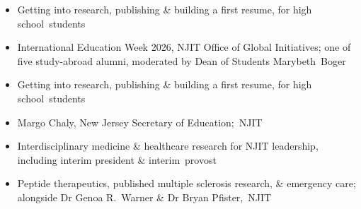 \begin{itemize}
  \item Getting into research, publishing \& building a first resume, for high \cvkeep{}school~\cvlast{}students\cvkeepend{}
\end{itemize}
\begin{itemize}
  \item International Education Week 2026, NJIT Office of Global Initiatives; one of five study-abroad alumni, moderated by Dean of Students \cvkeep{}Marybeth~\cvlast{}Boger\cvkeepend{}
\end{itemize}
\begin{itemize}
  \item Getting into research, publishing \& building a first resume, for high \cvkeep{}school~\cvlast{}students\cvkeepend{}
\end{itemize}
\begin{itemize}
  \item Margo Chaly, New Jersey Secretary of \cvkeep{}Education;~\cvlast{}NJIT\cvkeepend{}
\end{itemize}
\begin{itemize}
  \item Interdisciplinary medicine \& healthcare research for NJIT leadership, including interim president \& \cvkeep{}interim~\cvlast{}provost\cvkeepend{}
\end{itemize}
\begin{itemize}
  \item Peptide therapeutics, published multiple sclerosis research, \& emergency care; alongside Dr Genoa R.~Warner \& Dr Bryan \cvkeep{}Pfister,~\cvlast{}NJIT\cvkeepend{}
\end{itemize}

